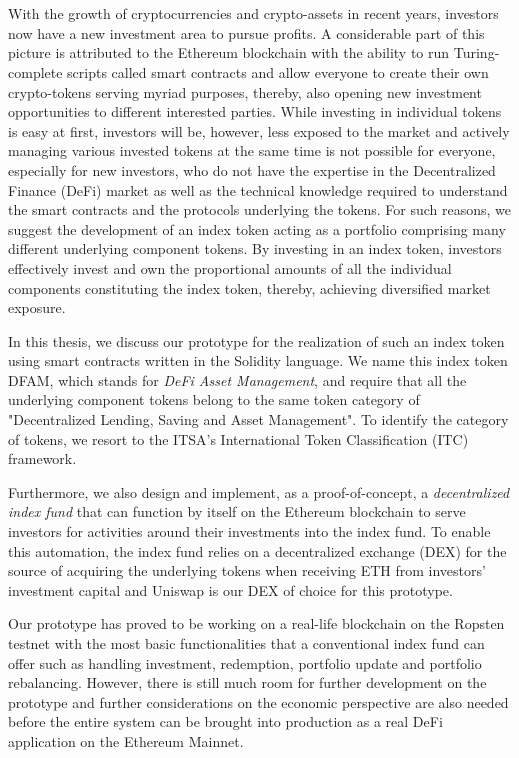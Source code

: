\chapter{\abstractname}


With the growth of cryptocurrencies and crypto-assets in recent years, investors now have a new investment area to pursue profits. A considerable part of this picture is attributed to the Ethereum blockchain with the ability to run Turing-complete scripts called smart contracts and allow everyone to create their own crypto-tokens serving myriad purposes, thereby, also opening new investment opportunities to different interested parties. While investing in individual tokens is easy at first, investors will be, however, less exposed to the market and actively managing various invested tokens at the same time is not possible for everyone, especially for new investors, who do not have the expertise in the Decentralized Finance (DeFi) market as well as the technical knowledge required to understand the smart contracts and the protocols underlying the tokens. For such reasons, we suggest the development of an index token acting as a portfolio comprising many different underlying component tokens. By investing in an index token, investors effectively invest and own the proportional amounts of all the individual components constituting the index token, thereby, achieving diversified market exposure.

In this thesis, we discuss our prototype for the realization of such an index token using smart contracts written in the Solidity language. We name this index token DFAM, which stands for \textit{DeFi Asset Management}, and require that all the underlying component tokens belong to the same token category of "Decentralized Lending, Saving and Asset Management". To identify the category of tokens, we resort to the ITSA's International Token Classification (ITC) framework.

Furthermore, we also design and implement, as a proof-of-concept, a \textit{decentralized index fund} that can function by itself on the Ethereum blockchain to serve investors for activities around their investments into the index fund. To enable this automation, the index fund relies on a decentralized exchange (DEX) for the source of acquiring the underlying tokens when receiving ETH from investors' investment capital and Uniswap is our DEX of choice for this prototype.

Our prototype has proved to be working on a real-life blockchain on the Ropsten testnet with the most basic functionalities that a conventional index fund can offer such as handling investment, redemption, portfolio update and portfolio rebalancing. However, there is still much room for further development on the prototype and further considerations on the economic perspective are also needed before the entire system can be brought into production as a real DeFi application on the Ethereum Mainnet. 








